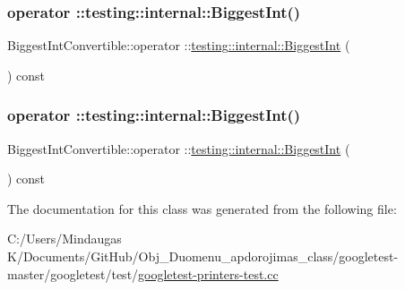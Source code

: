 \mbox{\label{class_biggest_int_convertible_a080f0dcdd3feff9a45be79492530129a}} 
\subsubsection{\texorpdfstring{operator ::testing::internal::BiggestInt()}{operator ::testing::internal::BiggestInt()}\hspace{0.1cm}{\footnotesize\ttfamily [2/3]}}
{\footnotesize\ttfamily Biggest\+Int\+Convertible\+::operator \+::\mbox{\hyperlink{namespacetesting_1_1internal_a05c6bd9ede5ccdf25191a590d610dcc6}{testing\+::internal\+::\+Biggest\+Int}} (\begin{DoxyParamCaption}{ }\end{DoxyParamCaption}) const\hspace{0.3cm}{\ttfamily [inline]}}

\mbox{\label{class_biggest_int_convertible_a080f0dcdd3feff9a45be79492530129a}} 
\subsubsection{\texorpdfstring{operator ::testing::internal::BiggestInt()}{operator ::testing::internal::BiggestInt()}\hspace{0.1cm}{\footnotesize\ttfamily [3/3]}}
{\footnotesize\ttfamily Biggest\+Int\+Convertible\+::operator \+::\mbox{\hyperlink{namespacetesting_1_1internal_a05c6bd9ede5ccdf25191a590d610dcc6}{testing\+::internal\+::\+Biggest\+Int}} (\begin{DoxyParamCaption}{ }\end{DoxyParamCaption}) const\hspace{0.3cm}{\ttfamily [inline]}}



The documentation for this class was generated from the following file\+:\begin{DoxyCompactItemize}
\item 
C\+:/\+Users/\+Mindaugas K/\+Documents/\+Git\+Hub/\+Obj\+\_\+\+Duomenu\+\_\+apdorojimas\+\_\+class/googletest-\/master/googletest/test/\mbox{\hyperlink{googletest-master_2googletest_2test_2googletest-printers-test_8cc}{googletest-\/printers-\/test.\+cc}}\end{DoxyCompactItemize}
